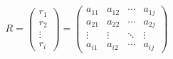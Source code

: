 \begin{center}
    \[  \textit{R} = 
        \begin{pmatrix}
            \textit{r$_{1}$}  \\ 
            \textit{r$_{2}$}  \\ 
            \vdots  \\ 
            \textit{r$_{i}$}
        \end{pmatrix} 
        =
        \begin{pmatrix}
            a_{11}  &  a_{12}  &  \cdots   & a_{1j} \\ 
            a_{21}  &  a_{22}  &  \cdots   & a_{2j}\\ 
            \vdots  &  \vdots  &  \ddots & \vdots  \\ 
            a_{i1}  &  a_{i2}  &  \cdots   & a_{ij}
        \end{pmatrix}
    \]
\end{center}
\newpage
